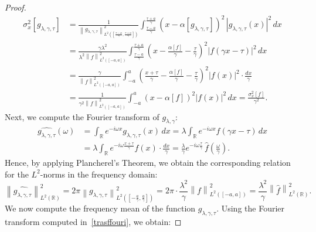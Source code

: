 \documentclass[preprint,hidelinks,authoryear]{elsarticle}
\theoremstyle{plain}
\theoremstyle{definition}
\theoremstyle{remark}
\begin{document}
\begin{proof}
\begin{equation}
\begin{split}
\sigma_x^2[g_{\lambda,\gamma,\tau}] 
&= \frac{1}{\left\| g_{\lambda,\gamma,\tau} \right\|^2_{L^2\left( \left[ \frac{\tau-a}{\gamma}, \frac{\tau+a}{\gamma} \right] \right)}} \int_{\frac{\tau-a}{\gamma}}^{\frac{\tau+a}{\gamma}} (x - \alpha[g_{\lambda,\gamma,\tau}])^2 \, |g_{\lambda,\gamma,\tau}(x)|^2 \, dx \\
&= \frac{\gamma \lambda^2}{\lambda^2 \left\| f \right\|^2_{L^2([-a,a])}} \int_{\frac{\tau-a}{\gamma}}^{\frac{\tau+a}{\gamma}} \left(x - \frac{\alpha[f]}{\gamma}-\displaystyle\frac{\tau}{\gamma}\right)^2 |f(\gamma x-\tau)|^2 \, dx \\
&= \frac{\gamma}{\left\| f \right\|^2_{L^2([-a,a])}} \int_{-a}^{a} \left( \frac{x+\tau}{\gamma}-\frac{\alpha[f]}{\gamma}-\displaystyle\frac{\tau}{\gamma} \right)^2 |f(x)|^2 \cdot \frac{dx}{\gamma} \\
&= \frac{1}{\gamma^2 \left\| f \right\|^2_{L^2([-a,a])}} \int_{-a}^{a} (x - \alpha[f])^2 |f(x)|^2 \, dx 
= \frac{\sigma_x^2[f]}{\gamma^2}.
\end{split}
\label{varianzalambagspaziale}
\end{equation}
Next, we compute the Fourier transform of $ g_{\lambda,\gamma} $:
\begin{equation}
\begin{split}
\widehat{g_{\lambda,\gamma,\tau}}(\omega) 
&= \int_{\mathbb{R}} e^{-i \omega x} g_{\lambda,\gamma,\tau}(x) \, dx 
= \lambda \int_{\mathbb{R}} e^{-i \omega x} f(\gamma x-\tau) \, dx \\
&= \lambda \int_{\mathbb{R}} e^{-i \omega \frac{x+\tau}{\gamma}} f(x) \cdot \frac{dx}{\gamma} 
= \frac{\lambda}{\gamma}e^{-i\omega\frac{\tau}{\gamma}} \, \widehat{f} \left( \frac{\omega}{\gamma} \right).
\end{split}
\label{trasffouri}
\end{equation}
Hence, by applying Plancherel’s Theorem, we obtain the corresponding relation for the $ L^2 $-norms in the frequency domain:
\begin{equation}
\left\| \widehat{g_{\lambda,\gamma,\tau}} \right\|^2_{L^2(\mathbb{R})} 
= 2\pi \left\| g_{\lambda,\gamma,\tau} \right\|^2_{L^2\left( \left[-\frac{a}{\gamma}, \frac{a}{\gamma} \right] \right)} 
= 2\pi \cdot \frac{\lambda^2}{\gamma} \left\| f \right\|^2_{L^2([-a,a])} 
= \frac{\lambda^2}{\gamma} \left\| \widehat{f} \right\|^2_{L^2(\mathbb{R})}.
\label{ugunormfrequenza}
\end{equation}
We now compute the frequency mean of the function $ g_{\lambda,\gamma,\tau} $. Using the Fourier transform computed in~\eqref{trasffouri}, we obtain:

\end{proof}
\end{document}
